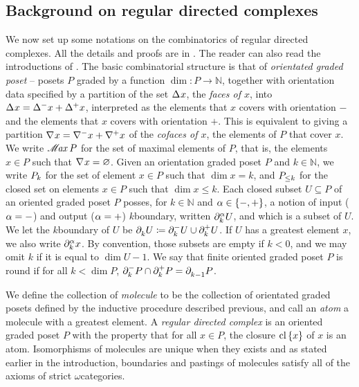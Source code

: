 \subsection*{Background on regular directed complexes}

We now set up some notations on the combinatorics of regular directed complexes.
All the details and proofs are in \cite{hadzihasanovic2024combinatorics}.
The reader can also read the introductions of \cite{chanavat2024htpy, chanavat2024equivalences, chanavat2024model}.
The basic combinatorial structure is that of \emph{orientated graded poset} -- posets \( P \) graded by a function \( \dim \colon P \to \mathbb{N} \), together with orientation data specified by a partition of the set \( \faces{}{} x \), the \emph{faces of \( x \)}, into \( \faces{}{} x = \faces{}{-} x + \faces{}{+} x \), interpreted as the elements that \( x \) covers with orientation \( - \) and the elements that \( x \) covers with orientation \( + \). 
This is equivalent to giving a partition \( \cofaces{}{} x = \cofaces{}{-} x + \cofaces{}{+} x \) of the \emph{cofaces of \( x \)}, the elements of \( P \) that cover \( x \).
We write \( \maxel{P} \) for the set of maximal elements of \( P \), that is, the elements \( x \in P \) such that \( \cofaces{}{} x = \varnothing \).
Given an orientation graded poset \( P \) and \( k \in \mathbb{N} \), we write \( \gr{k}{P} \) for the set of element \( x \in P \) such that \( \dim x = k \), and \( \gr{\le k}{P} \) for the closed set on elements \( x \in P \) such that \( \dim x \le k \). 
Each closed subset \( U \subseteq P \) of an oriented graded poset \( P \) posses, for \( k \in \mathbb{N} \) and \( \a \in \set{-, +} \), a notion of input (\( \a = - \)) and output (\( \a = + \)) \( k \)\nbd boundary, written \( \bd{k}{\a} U \), and which is a subset of \( U \). 
We let the \( k \)\nbd boundary of \( U \) be \( \bd{k}{} U \eqdef \bd{k}{-} U \cup \bd{k}{+} U \).
If \( U \) has a greatest element \( x \), we also write \( \bd{k}{\a} x \). 
By convention, those subsets are empty if \( k < 0 \), and we may omit \( k \) if it is equal to \( \dim U - 1 \).
We say that finite oriented graded poset \( P \) is round if for all \( k < \dim P  \), \( \bd{k}{-} P \cap \bd{k}{+} P = \bd{k - 1}{} P \).

We define the collection of \emph{molecule} to be the collection of orientated graded posets defined by the inductive procedure described previous, and call an \emph{atom} a molecule with a greatest element.
A \emph{regular directed complex} is an oriented graded poset \( P \) with the property that for all \( x \in P \), the closure \( \clset{x} \) of \( x \) is an atom.
Isomorphisms of molecules are unique when they exists and as stated earlier in the introduction, boundaries and pastings of molecules satisfy all of the axioms of strict \( \omega \)\nbd categories.

